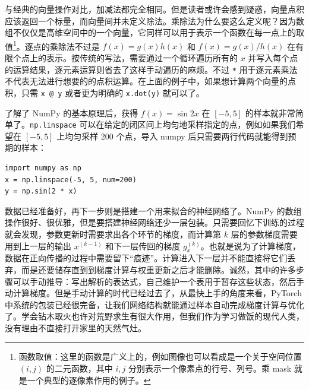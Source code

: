与经典的向量操作对比，加减法都完全相同。但是读者或许会感到疑惑，向量点积应该返回一个标量，而向量间并未定义除法。乘除法为什么要这么定义呢？因为数组不仅仅是高维空间中的一个向量，它同样可以用于表示一个函数在每一点上的取值\footnote{函数取值：这里的函数是广义上的，例如图像也可以看成是一个关于空间位置 $(i, j)$ 的二元函数，其中 $i,j$ 分别表示一个像素点的行号、列号。乘 mask 就是一个典型的逐像素作用的例子。}。逐点的乘除法不过是 $f(x) = g(x) h(x)$ 和 $f(x) = g(x) / h(x)$ 在有限个点上的表示。按传统的写法，需要通过一个循环遍历所有的 $x$ 并写入每个点的运算结果，逐元素运算则省去了这样手动遍历的麻烦。不过 \texttt{*} 用于逐元素乘法不代表无法进行想要的的点积运算。在上面的例子中，如果想计算两个向量的点积，只需 \texttt{x @ y} 或者更为明确的 \texttt{x.dot(y)} 就可以了。

了解了 NumPy 的基本原理后，获得 $f(x) = \sin 2x$ 在 $[-5, 5]$ 的样本就非常简单了。\texttt{np.linspace} 可以在给定的闭区间上均匀地采样指定的点，例如如果我们希望在 $[-5, 5]$ 上均匀采样 200 个点，导入 numpy 后只需要两行代码就能得到预期的样本：
\begin{verbatim}
import numpy as np
x = np.linspace(-5, 5, num=200)
y = np.sin(2 * x)
\end{verbatim}

数据已经准备好，再下一步则是搭建一个用来拟合的神经网络了。NumPy 的数组操作很好、很优雅，但是要搭建神经网络还少一层包装。只需要回忆下训练的过程就会发现，参数更新时需要求出各个环节的梯度，而计算第 $k$ 层的参数梯度需要用到上一层的输出 $x^{(k - 1)}$ 和下一层传回的梯度 $g_x^{(k)}$。也就是说为了计算梯度，数据在正向传播的过程中需要留下“痕迹”。计算进入下一层并不能直接将它们丢弃，而是还要储存直到到梯度计算与权重更新之后才能删除。诚然，其中的许多步骤可以手动推导：写出解析的表达式，自己维护一个表用于暂存这些状态，然后手动计算梯度。但是手动计算的时代已经过去了，从最快上手的角度来看，PyTorch 中系统的包装已经很完备，让我们网络结构就能通过样本自动完成梯度计算与优化了。学会钻木取火也许对荒野求生有很大作用，但我们作为学习做饭的现代人类，没有理由不直接打开家里的天然气灶。

